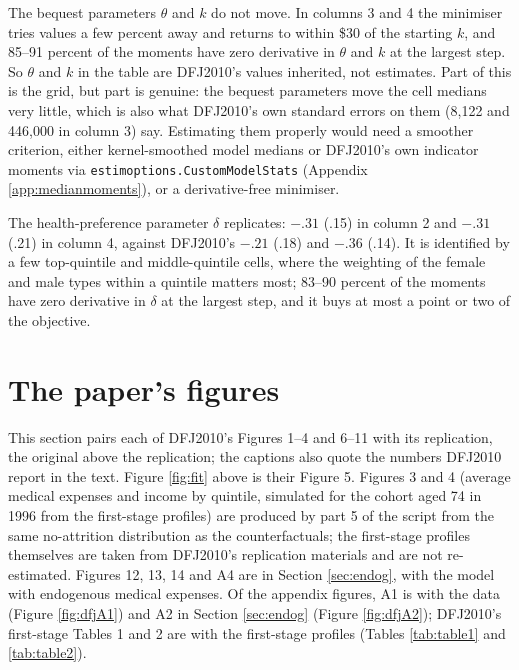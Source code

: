 \documentclass[11pt,fleqn]{article}
\begin{document}
The bequest parameters $\theta$ and $k$ do not move. In columns 3 and 4 the minimiser tries values a few percent away and returns to within \$30 of the starting $k$, and 85--91 percent of the moments have zero derivative in $\theta$ and $k$ at the largest step. So $\theta$ and $k$ in the table are DFJ2010's values inherited, not estimates. Part of this is the grid, but part is genuine: the bequest parameters move the cell medians very little, which is also what DFJ2010's own standard errors on them (8,122 and 446,000 in column 3) say. Estimating them properly would need a smoother criterion, either kernel-smoothed model medians or DFJ2010's own indicator moments via \texttt{estimoptions.CustomModelStats} (Appendix \ref{app:medianmoments}), or a derivative-free minimiser.

The health-preference parameter $\delta$ replicates: $-.31$ (.15) in column 2 and $-.31$ (.21) in column 4, against DFJ2010's $-.21$ (.18) and $-.36$ (.14). It is identified by a few top-quintile and middle-quintile cells, where the weighting of the female and male types within a quintile matters most; 83--90 percent of the moments have zero derivative in $\delta$ at the largest step, and it buys at most a point or two of the objective.

\section{The paper's figures}\label{sec:figures}
This section pairs each of DFJ2010's Figures 1--4 and 6--11 with its replication, the original above the replication; the captions also quote the numbers DFJ2010 report in the text. Figure \ref{fig:fit} above is their Figure 5. Figures 3 and 4 (average medical expenses and income by quintile, simulated for the cohort aged 74 in 1996 from the first-stage profiles) are produced by part 5 of the script from the same no-attrition distribution as the counterfactuals; the first-stage profiles themselves are taken from DFJ2010's replication materials and are not re-estimated. Figures 12, 13, 14 and A4 are in Section \ref{sec:endog}, with the model with endogenous medical expenses. Of the appendix figures, A1 is with the data (Figure \ref{fig:dfjA1}) and A2 in Section \ref{sec:endog} (Figure \ref{fig:dfjA2}); DFJ2010's first-stage Tables 1 and 2 are with the first-stage profiles (Tables \ref{tab:table1} and \ref{tab:table2}).
\end{document}

